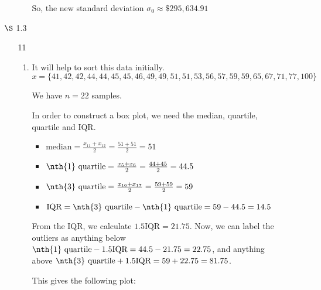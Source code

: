 \documentclass[12pt,letterpaper]{article}
\begin{document}
\begin{enumerate}
\begin{enumerate}
\begin{enumerate}[label=(\arabic*)]
              So, the new standard deviation $\sigma_0 \approx \$295,634.91$

          \end{enumerate}
      \end{enumerate}

    \item [$\S$ 1.3]

      \begin{enumerate}
        \item [11]
          \begin{enumerate}[label=(\arabic*)]
            \item

              It will help to sort this data initially.
              \[
                x = \{41, 42, 42, 44, 44, 45, 45, 46, 49, 49, 51, 51, 53, 56, 57, 59, 59, 65, 67, 71, 77, 100\}
              \]

              We have $n = 22$ samples.

              In order to construct a box plot,
              we need the median,  quartile,  quartile and IQR.

              \begin{itemize}
                \item
                  $\text{median} = \frac{x_{11} + x_{12}}{2} = \frac{51 + 51}{2} = 51$
                \item
                  $\text{\nth{1} quartile} = \frac{x_{5} + x_{6}}{2} = \frac{44 + 45}{2} = 44.5$
                \item
                  $\text{\nth{3} quartile} = \frac{x_{16} + x_{17}}{2} = \frac{59 + 59}{2} = 59$
                \item
                  $\text{IQR} = \text{\nth{3} quartile} - \text{\nth{1} quartile} = 59 - 44.5 = 14.5$
              \end{itemize}
              From the IQR, we calculate $1.5 \text{IQR} = 21.75$.
              Now, we can label the outliers as anything below $\text{\nth{1} quartile} - 1.5\text{IQR} = 44.5 - 21.75 = 22.75$,
              and anything above $\text{\nth{3} quartile} + 1.5\text{IQR} = 59 + 22.75 = 81.75$.

              This gives the following plot:


\end{enumerate}
\end{enumerate}
\end{enumerate}
\end{document}
